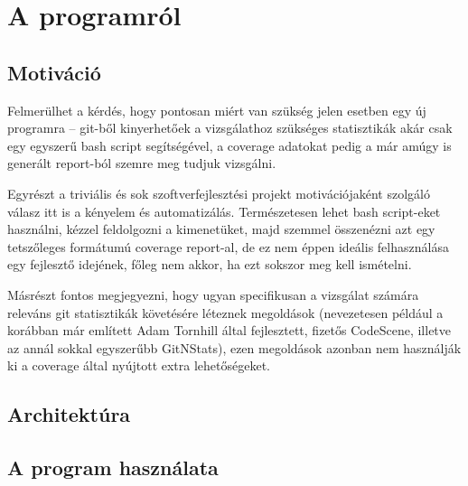 \chapter{A programról}
\label{ch:about_hestia}

\section{Motiváció}

Felmerülhet a kérdés, hogy pontosan miért van szükség jelen esetben egy új programra -- git-ből kinyerhetőek a vizsgálathoz szükséges statisztikák akár csak egy egyszerű bash script segítségével, a coverage adatokat pedig a már amúgy is generált report-ból szemre meg tudjuk vizsgálni.

Egyrészt a triviális és sok szoftverfejlesztési projekt motivációjaként szolgáló válasz itt is a kényelem és automatizálás. Természetesen lehet bash script-eket használni, kézzel feldolgozni a kimenetüket, majd szemmel összenézni azt egy tetszőleges formátumú coverage report-al, de ez nem éppen ideális felhasználása egy fejlesztő idejének, főleg nem akkor, ha ezt sokszor meg kell ismételni.

Másrészt fontos megjegyezni, hogy ugyan specifikusan a vizsgálat számára releváns git statisztikák követésére léteznek megoldások (nevezetesen például a korábban már említett Adam Tornhill által fejlesztett, fizetős CodeScene, illetve az annál sokkal egyszerűbb GitNStats), ezen megoldások azonban nem használják ki a coverage által nyújtott extra lehetőségeket.

\section{Architektúra}

\section{A program használata}